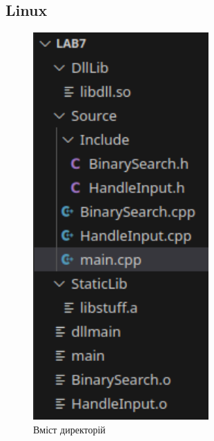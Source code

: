 \documentclass[12pt]{extarticle}
\begin{document}
\subsection*{Linux}


\begin{figure}[H]
    \centering
    \includegraphics[width=0.60\textwidth]{dir}
    \caption{Вміст директорій}
\end{figure}
\end{document}
